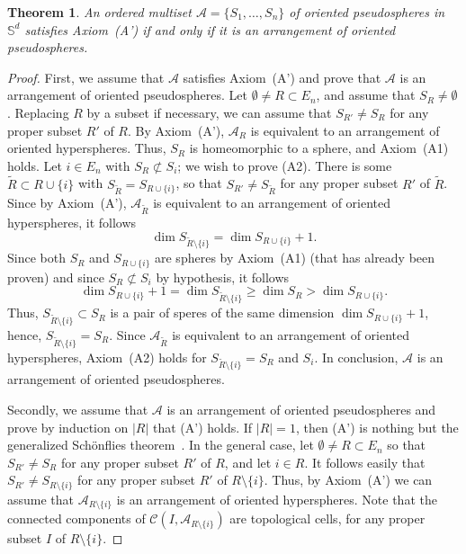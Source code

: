 \documentclass[a4paper]{amsart}
\newcommand{\p}{\mathbb S}
\newtheorem{theorem}{Theorem}
\theoremstyle{definition}
\theoremstyle{remark}
\begin{document}
\begin{theorem}\label{thm:PSA}
  An ordered multiset $\mathcal A= \{S_1,\dots, S_n\}$ of oriented
  pseudospheres in $\p^d$ satisfies Axiom~(A') if and only if it is an
  arrangement of oriented pseudospheres.
\end{theorem}
\begin{proof}
  First, we assume that $\mathcal A$ satisfies Axiom~(A') and prove that
  $\mathcal A$ is an arrangement of oriented pseudospheres. 
%
  Let $\emptyset \not= R\subset E_n$, and assume that $S_R\not=\emptyset$. 
  Replacing $R$ by a subset if necessary, we can assume
  that $S_{R'}\not= S_R$ for any proper subset $R'$ of $R$. 
%
  By Axiom~(A'),
  $\mathcal A_R$ is equivalent  to an arrangement of oriented
  hyperspheres. Thus, $S_R$ is homeomorphic to a sphere, and Axiom~(A1)
  holds. 
%
  Let $i\in E_n$ with $S_R\not\subset S_i$; we wish to prove (A2).
  There is some $\tilde R\subset R\cup\{i\}$ with $S_{\tilde
    R}=S_{R\cup\{i\}}$, so that $S_{R'}\not=S_{\tilde R}$ for any proper
  subset $R'$ of $\tilde R$.
  Since by Axiom~(A'), $\mathcal A_{\tilde R}$ is equivalent to an
  arrangement of oriented hyperspheres, it follows
  $$ \dim S_{\tilde R\setminus \{i\}} = \dim S_{R\cup \{i\}} +1.$$
  Since both $S_R$ and $S_{R\cup \{i\}}$ are spheres by Axiom~(A1) (that
  has already been proven) and since  $S_R\not\subset S_i$ by hypothesis, it
  follows 
  $$
  \dim S_{R\cup \{i\}} +1 = \dim S_{\tilde R\setminus \{i\}} \ge \dim
  S_R > \dim S_{R\cup\{i\}}.$$
%
  Thus, $S_{\tilde R\setminus \{i\}}\subset S_R$ is a pair of speres of
  the same dimension $\dim S_{R\cup \{i\}} +1$, hence, $S_{\tilde
    R\setminus \{i\}}= S_R$.  
%
  Since $\mathcal A_{\tilde R}$ is equivalent to an arrangement of
  oriented hyperspheres, Axiom~(A2) holds for $S_{\tilde R\setminus
    \{i\}}= S_R$ and $S_i$.  In conclusion, $\mathcal A$ is an
  arrangement of oriented pseudospheres.
  
  Secondly, we assume that $\mathcal A$ is an arrangement of oriented
  pseudospheres and prove by induction on $|R|$ that (A') holds. If
  $|R|=1$, then (A') is nothing but 
  the generalized Sch{\"o}nflies  theorem~\cite{brown}.
%
  In the general case, let $\emptyset \not= R\subset E_n$ so that $S_{R'}\not= S_R$ for
  any proper subset $R'$ of $R$, and let $i\in R$.
  It follows easily that $S_{R'}\not=S_{R\setminus \{i\}}$ for any
  proper subset $R'$ of $R\setminus \{i\}$. Thus, by Axiom~(A') we can
  assume that $\mathcal A_{R\setminus\{i\}}$ is an arrangement of
  oriented hyperspheres. Note that the connected components of $\mathcal
  C(I,\mathcal A_{R\setminus \{i\}})$ are topological cells, for any
  proper subset $I$ of $R\setminus \{i\}$.
  

\end{proof}
\end{document}
